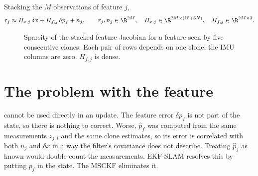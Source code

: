 Stacking the $M$ observations of feature $j$,
\begin{equation}
  r_j \approx H_{x,j}\,\delta x + H_{f,j}\,\delta p_f + n_j, \qquad
  r_j, n_j \in \R^{2M},\quad H_{x,j} \in \R^{2M\times(15+6N)},\quad H_{f,j} \in \R^{2M\times3}.
  \label{eq:stacked-feature}
\end{equation}

\begin{figure}[t]
\centering
{}
\caption{Sparsity of the stacked feature Jacobian for a feature seen by five consecutive clones. Each pair of rows depends
on one clone; the IMU columns are zero. $H_{f,j}$ is dense.}
\label{fig:hx-sparsity}
\end{figure}

\section{The problem with the feature}

 cannot be used directly in an update. The feature error $\delta p_f$ is not part of the state, so there is
nothing to correct. Worse, $\hat p_f$ was computed from the same measurements $z_{j,i}$ and the same clone estimates, so its error is
correlated with both $n_j$ and $\delta x$ in a way the filter's covariance does not describe. Treating $\hat p_f$ as known would
double count the measurements. EKF-SLAM resolves this by putting $p_f$ in the state. The MSCKF eliminates it.


